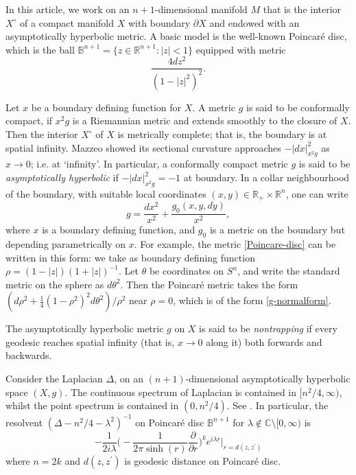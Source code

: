 \documentclass[10pt, a4paper, twoside]{amsart}
\numberwithin{equation}{section}
\theoremstyle{remark}
\begin{document}
In this article, we work on an $n + 1$-dimensional manifold $M$ that is the interior $X^\circ$ of a compact manifold $X$ with boundary $\partial X$ and endowed with an asymptotically hyperbolic metric. A basic model is the well-known Poincar\'{e} disc, which is the ball $\mathbb{B}^{n + 1} = \{z \in \mathbb{R}^{n + 1} : |z| < 1\}$ equipped with metric 
\begin{equation}
\frac{4 dz^2}{(1 - |z|^2)^2}. 
\label{Poincare-disc}\end{equation}

Let $x$ be a boundary defining function for $X$. A metric $g$ is said to be conformally compact, if $x^2 g$ is a Riemannian metric and extends smoothly to the closure of $X$. Then the interior $X^\circ$ of $X$ is metrically complete; that is, the boundary is at spatial infinity.  Mazzeo \cite{Mazzeo-JDG-1988} showed its sectional curvature approaches $- |dx|^2_{x^2 g}$ as $x \rightarrow 0$; i.e. at `infinity'. In particular, a conformally compact metric $g$ is said to be \emph{asymptotically hyperbolic} if $- |dx|^2_{x^2 g} = - 1$ at boundary. In a collar neighbourhood of the boundary, with suitable local coordinates $(x, y) \in {\mathbb{R}}_+ \times {\mathbb{R}}^n$, one can write
\begin{equation}
g = \frac{dx^2}{x^2} + \frac{g_0(x, y, dy)}{x^2},
\label{g-normalform}\end{equation}
 where $x$ is a boundary defining function, and $g_0$ is a metric on the boundary but depending parametrically on $x$. For example, the metric \eqref{Poincare-disc} can be written in this form: we take as boundary defining function $\rho = (1 - |z|)(1+|z|)^{-1}$. Let $\theta$ be coordinates on $S^n$, and write the standard metric on the sphere as $d\theta^2$. Then the Poincar\'e metric takes the form 
$(d\rho^2 + \frac1{4}(1-\rho^2)^{2} d\theta^2) / \rho^2$ near $\rho = 0$, which is of the form \eqref{g-normalform}.  

The asymptotically hyperbolic metric $g$ on $X$ is said to be \emph{nontrapping} if every geodesic reaches spatial infinity (that is, $x \to 0$ along it) both forwards and backwards. 

Consider the Laplacian $\Delta$, on an $(n+1)$-dimensional  asymptotically hyperbolic space $(X, g)$. The continuous spectrum of Laplacian is contained in $[n^2/4 , \infty)$, whilst the point spectrum is contained in $(0, n^2/4)$. See \cite{Mazzeo-Melrose}. In particular, the resolvent $(\Delta - n^2/4 - \lambda^2)^{-1}$ on Poincar\'{e} disc $\mathbb{B}^{n + 1}$ for $\lambda \notin \mathbb{C} \setminus [0, \infty)$ is \begin{equation}\label{hyperbolic resolvent} - \frac{1}{2i \lambda} \bigg( - \frac{1}{2\pi \sinh(r)} \frac{\partial}{\partial r} \bigg)^k e^{i \lambda r} \bigg|_{r = d(z, z^\prime)}\end{equation} where $n = 2k$ and $d(z, z^\prime)$ is geodesic distance on Poincar\'{e} disc.
\end{document}
